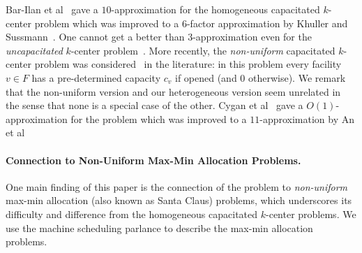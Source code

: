 Bar-Ilan et al~\cite{BKP93} gave a $10$-approximation for the homogeneous capacitated $k$-center problem which was improved to a $6$-factor approximation by Khuller and Sussmann~\cite{KS}. One cannot get a better than $3$-approximation even for the {\em uncapacitated} $k$-center problem~\cite{Hochbaum-shmoys}. More recently, the {\em non-uniform} capacitated $k$-center problem was considered~\cite{cygan-haji, an-et-al} in the literature: in this problem every facility $v\in F$ has a pre-determined capacity $c_v$ if opened (and $0$ otherwise). We remark that the non-uniform version and our heterogeneous version seem unrelated in the sense that none is a special case of the other. 
Cygan et al~\cite{cygan-haji-khuller} gave a $O(1)$-approximation for the problem which was improved to a $11$-approximation by An et al~\cite{bibid}




%
% 
%
\paragraph{Connection to Non-Uniform Max-Min Allocation Problems.}
One main finding of this paper is the connection of the \mckc problem to {\em non-uniform} max-min allocation (also known as Santa Claus) problems, which
 underscores its difficulty and difference from  the homogeneous capacitated $k$-center problems. %
We use the machine scheduling parlance to describe the max-min allocation problems. 

